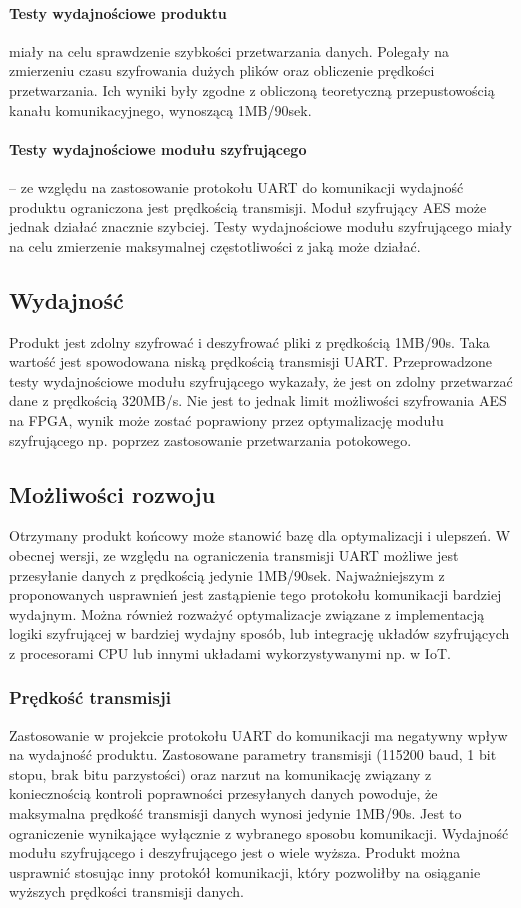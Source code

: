 \paragraph{Testy wydajnościowe produktu} miały na celu sprawdzenie szybkości przetwarzania danych. Polegały na zmierzeniu czasu szyfrowania dużych plików oraz obliczenie prędkości przetwarzania. Ich wyniki były zgodne z obliczoną teoretyczną przepustowością kanału komunikacyjnego, wynoszącą 1MB/90sek.

\paragraph{Testy wydajnościowe modułu szyfrującego} -- ze względu na zastosowanie protokołu UART do komunikacji wydajność produktu ograniczona jest prędkością transmisji. Moduł szyfrujący AES może jednak działać znacznie szybciej. Testy wydajnościowe modułu szyfrującego miały na celu zmierzenie maksymalnej częstotliwości z jaką może działać.

\subsection{Wydajność}
Produkt jest zdolny szyfrować i deszyfrować pliki z prędkością 1MB/90s. Taka wartość jest spowodowana niską prędkością transmisji UART. Przeprowadzone testy wydajnościowe modułu szyfrującego wykazały, że jest on zdolny przetwarzać dane z prędkością 320MB/s. Nie jest to jednak limit możliwości szyfrowania AES na FPGA, wynik może zostać poprawiony przez optymalizację modułu szyfrującego np. poprzez zastosowanie przetwarzania potokowego.

\subsection{Możliwości rozwoju}
Otrzymany produkt końcowy może stanowić bazę dla optymalizacji i ulepszeń. W obecnej wersji, ze względu na ograniczenia transmisji UART możliwe jest przesyłanie danych z prędkością jedynie 1MB/90sek. Najważniejszym z proponowanych usprawnień jest zastąpienie tego protokołu komunikacji bardziej wydajnym. Można również rozważyć optymalizacje związane z implementacją logiki szyfrującej w bardziej wydajny sposób, lub integrację układów szyfrujących z procesorami CPU lub innymi układami wykorzystywanymi np. w IoT.

\subsubsection{Prędkość transmisji}
Zastosowanie w projekcie protokołu UART do komunikacji ma negatywny wpływ na wydajność produktu. Zastosowane parametry transmisji (115200 baud, 1 bit stopu, brak bitu parzystości) oraz narzut na komunikację związany z koniecznością kontroli poprawności przesyłanych danych powoduje, że maksymalna prędkość transmisji danych wynosi jedynie 1MB/90s. Jest to ograniczenie wynikające wyłącznie z wybranego sposobu komunikacji. Wydajność modułu szyfrującego i deszyfrującego jest o wiele wyższa. Produkt można usprawnić stosując inny protokół komunikacji, który pozwoliłby na osiąganie wyższych prędkości transmisji danych.

